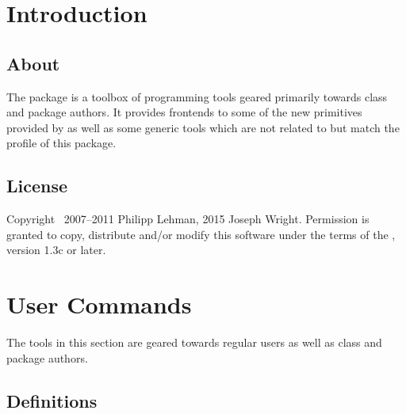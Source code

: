 \documentclass{ltxdockit}[2010/09/26]
\begin{document}
\printtitlepage
\tableofcontents

\section{Introduction}
\label{int}

\subsection[About]{About }

The  package is a toolbox of programming tools geared primarily towards \latex class and package authors. It provides \latex frontends to some of the new primitives provided by \etex as well as some generic tools which are not related to \etex but match the profile of this package.

\subsection{License}

Copyright \textcopyright\ 2007--2011 Philipp Lehman, 2015 Joseph Wright. Permission is granted to copy, distribute and\slash or modify this software under the terms of the \lppl, version 1.3c or later.

\section{User Commands}
\label{use}

The tools in this section are geared towards regular users as well as class and package authors.

\subsection{Definitions}
\label{use:def}
\end{document}
